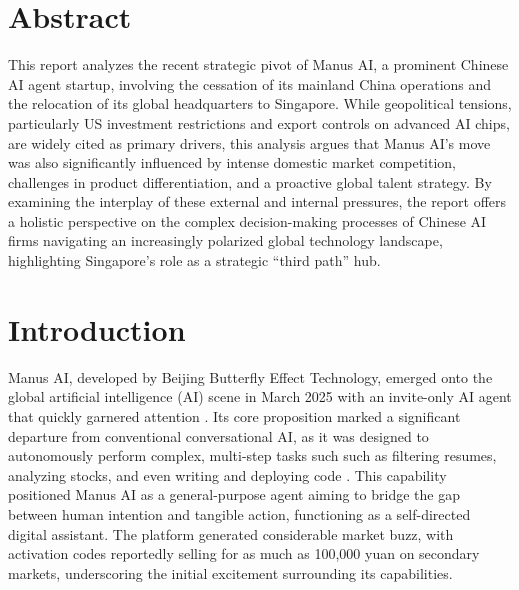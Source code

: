 



\section*{Abstract}
This report analyzes the recent strategic pivot of Manus AI, a prominent Chinese AI agent startup, involving the cessation of its mainland China operations and the relocation of its global headquarters to Singapore.
While geopolitical tensions, particularly US investment restrictions and export controls on advanced AI chips, are widely cited as primary drivers, this analysis argues that Manus AI's move was also significantly influenced by intense domestic market competition, challenges in product differentiation, and a proactive global talent strategy.
By examining the interplay of these external and internal pressures, the report offers a holistic perspective on the complex decision-making processes of Chinese AI firms navigating an increasingly polarized global technology landscape, highlighting Singapore's role as a strategic ``third path'' hub.

\section{Introduction}

Manus AI, developed by Beijing Butterfly Effect Technology, emerged onto the global artificial intelligence (AI) scene in March 2025 with an invite-only AI agent that quickly garnered attention \cite{kiledjian_manus_promises}.
Its core proposition marked a significant departure from conventional conversational AI, as it was designed to autonomously perform complex, multi-step tasks such such as filtering resumes, analyzing stocks, and even writing and deploying code \cite{baytech_manus_guide}.
This capability positioned Manus AI as a general-purpose agent aiming to bridge the gap between human intention and tangible action, functioning as a self-directed digital assistant.
The platform generated considerable market buzz, with activation codes reportedly selling for as much as 100,000 yuan on secondary markets, underscoring the initial excitement surrounding its capabilities.

